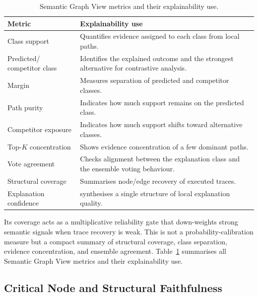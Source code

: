 \documentclass[runningheads]{llncs}
\begin{document}
\begin{table}[h!]
\centering
\small
\caption{Semantic Graph View metrics and their explainability use.}
\label{tab:semantic-metrics}
\setlength{\tabcolsep}{5pt}
\begin{tabular}{p{3.3cm} p{8.5cm}}
\toprule
Metric & Explainability use \\
\midrule
Class support & Quantifies evidence assigned to each class from local paths. \\
\addlinespace[1pt]
Predicted/ competitor class & Identifies the explained outcome and the strongest alternative for contrastive analysis. \\
\addlinespace[1pt]
Margin & Measures separation of predicted and competitor classes. \\
\addlinespace[1pt]
Path purity & Indicates how much support remains on the predicted class. \\
\addlinespace[1pt]
Competitor exposure & Indicates how much support shifts toward alternative classes. \\
\addlinespace[1pt]
Top-$K$ concentration & Shows evidence concentration of a few dominant paths. \\
\addlinespace[1pt]
Vote agreement & Checks alignment between the explanation class and the ensemble voting behaviour. \\
\addlinespace[1pt]
Structural coverage & Summarises node/edge recovery of executed traces. \\
\addlinespace[1pt]
Explanation confidence & synthesises a single structure of local explanation quality. \\
\bottomrule
\end{tabular}
\end{table}

Its coverage acts as a multiplicative reliability gate that down-weights strong semantic signals when trace recovery is weak.
This is not a probability-calibration measure but a compact summary of structural coverage, class separation, evidence concentration, and ensemble agreement. Table~\ref{tab:semantic-metrics} summarises all Semantic Graph View metrics and their explainability use.






\subsection{Critical Node and Structural Faithfulness}
\label{sec:structural-faithfulness}
\end{document}
